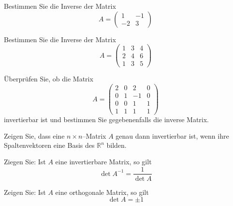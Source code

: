 \bigbreak


\begin{aufgabe} Bestimmen Sie die Inverse der Matrix
  	$$ A = \left(\begin{matrix} 1 & -1 \\ -2 & 3 \end{matrix} \right) $$ 
\end{aufgabe}

\begin{aufgabe} Bestimmen Sie die Inverse der Matrix
  	$$ A = \left(\begin{matrix} 1 & 3 & 4 \\ 2 & 4 & 6 \\ 1 & 3 & 5 \end{matrix} \right) $$
\end{aufgabe}

\begin{aufgabe} Überprüfen Sie, ob die Matrix 
  	$$ A = \left(\begin{matrix} 2 & 0 & 2 & 0 \\ 0 & 1 & -1 & 0 \\ 0 & 0 & 1 & 1 \\
	1 & 1 & 1 & 1 \end{matrix} \right) $$
invertierbar ist und bestimmen Sie gegebenenfalls die inverse Matrix.
\end{aufgabe}

\begin{aufgabe} Zeigen Sie, dass eine $n \times n$--Matrix $A$ genau dann invertierbar ist, wenn ihre 
Spaltenvektoren eine Basis des $\mathbb R^n$ bilden. 
\end{aufgabe}

\begin{aufgabe} Ziegen Sie: Ist $A$ eine invertierbare Matrix, so gilt
  	$$ \det{A^{-1}} = \frac {1}{\det{A}} $$
\end{aufgabe}

\begin{aufgabe} Zeigen Sie: Ist $A$ eine orthogonale Matrix, so gilt
  	$$ \det{A} =\pm 1 $$
\end{aufgabe}